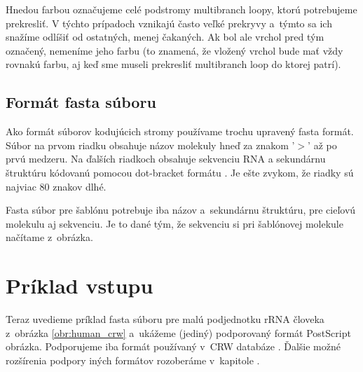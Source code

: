 Hnedou farbou označujeme celé podstromy multibranch loopy, ktorú potrebujeme
prekresliť. V týchto prípadoch vznikajú často veľké prekryvy a~týmto
sa ich snažíme odlíšiť od ostatných, menej čakaných.
Ak bol ale vrchol pred tým označený, nemeníme jeho farbu (to znamená, že vložený vrchol
bude mať vždy rovnakú farbu, aj keď sme museli prekresliť multibranch loop do ktorej patrí).





\subsection{Formát fasta súboru}

Ako formát súborov kodujúcich stromy používame trochu upravený fasta formát.
Súbor na prvom riadku obsahuje názov molekuly hneď za znakom '$>$' až po prvú medzeru.
Na ďalších riadkoch obsahuje sekvenciu RNA a sekundárnu štruktúru kódovanú
pomocou dot-bracket formátu .
Je ešte zvykom, že riadky sú najviac 80 znakov dlhé.

Fasta súbor pre šablónu potrebuje iba názov a~sekundárnu štruktúru,
pre cieľovú molekulu aj sekvenciu. Je to dané tým, že sekvenciu
si pri šablónovej molekule načítame z~obrázka.



\section{Príklad vstupu}

Teraz uvedieme príklad fasta súboru pre malú podjednotku rRNA človeka z~obrázka
\ref{obr:human_crw} a~ukážeme (jediný) podporovaný formát PostScript obrázka.
Podporujeme iba formát používaný v~CRW databáze .
Ďalšie možné rozšírenia podpory iných formátov rozoberáme v~kapitole
.

